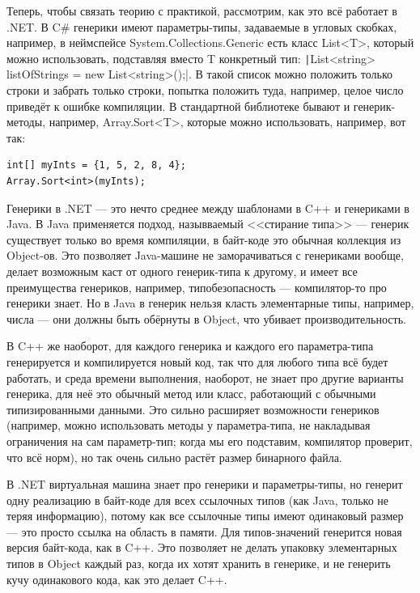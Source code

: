 \documentclass[a5paper]{article}
\begin{document}
Теперь, чтобы связать теорию с практикой, рассмотрим, как это всё работает в .NET. В C\# генерики имеют параметры-типы, задаваемые в угловых скобках, например, в неймспейсе System.Collections.Generic есть класс List<T>, который можно использовать, подставляя вместо T конкретный тип: \texttt|List<string> listOfStrings = new List<string>();|. В такой список можно положить только строки и забрать только строки, попытка положить туда, например, целое число приведёт к ошибке компиляции. В стандартной библиотеке бывают и генерик-методы, например, Array.Sort<T>, которые можно использовать, например, вот так:

\begin{verbatim}
int[] myInts = {1, 5, 2, 8, 4};
Array.Sort<int>(myInts);
\end{verbatim}

Генерики в .NET --- это нечто среднее между шаблонами в C++ и генериками в Java. В Java применяется подход, назывваемый <<стирание типа>> --- генерик существует только во время компиляции, в байт-коде это обычная коллекция из Object-ов. Это позволяет Java-машине не заморачиваться с генериками вообще, делает возможным каст от одного генерик-типа к другому, и имеет все преимущества генериков, например, типобезопасность --- компилятор-то про генерики знает. Но в Java в генерик нельзя класть элементарные типы, например, числа --- они должны быть обёрнуты в Object, что убивает производительность.

В C++ же наоборот, для каждого генерика и каждого его параметра-типа генерируется и компилируется новый код, так что для любого типа всё будет работать, и среда времени выполнения, наоборот, не знает про другие варианты генерика, для неё это обычный метод или класс, работающий с обычными типизированными данными. Это сильно расширяет возможности генериков (например, можно использовать методы у параметра-типа, не накладывая ограничения на сам параметр-тип; когда мы его подставим, компилятор проверит, что всё норм), но так очень сильно растёт размер бинарного файла.

В .NET виртуальная машина знает про генерики и параметры-типы, но генерит одну реализацию в байт-коде для всех ссылочных типов (как Java, только не теряя информацию), потому как все ссылочные типы имеют одинаковый размер --- это просто ссылка на область в памяти. Для типов-значений генерится новая версия байт-кода, как в C++. Это позволяет не делать упаковку элементарных типов в Object каждый раз, когда их хотят хранить в генерике, и не генерить кучу одинакового кода, как это делает C++.
\end{document}
